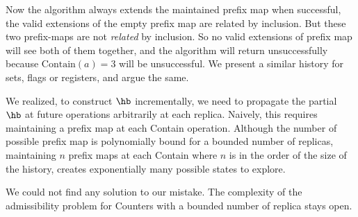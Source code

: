 Now the algorithm always extends the maintained prefix map \ie when successful, the valid extensions of the empty prefix map are related by inclusion. But these two prefix-maps are not \emph{related} by inclusion. So no valid extensions of prefix map will see both of them together, and the algorithm will return unsuccessfully because $\mathrm{Contain}(a) = 3$ will be unsuccessful. We present a similar history for sets, flags or registers, and argue the same.

We realized, to construct $\hb$ incrementally, we need to propagate the partial $\hb$ at future operations arbitrarily at each replica. Naively, this requires maintaining a prefix map at each \textrm{Contain} operation. Although the number of possible prefix map is polynomially bound for a bounded number of replicas, maintaining $n$ prefix maps at each \textrm{Contain} where $n$ is in the order of the size of the history, creates exponentially many possible states to explore.

We could not find any solution to our mistake. The complexity of the admissibility problem for Counters with a bounded number of replica stays open.